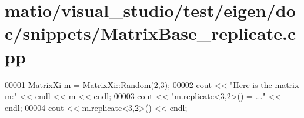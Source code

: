 \hypertarget{matio_2visual__studio_2test_2eigen_2doc_2snippets_2_matrix_base__replicate_8cpp_source}{}\section{matio/visual\+\_\+studio/test/eigen/doc/snippets/\+Matrix\+Base\+\_\+replicate.cpp}
\label{matio_2visual__studio_2test_2eigen_2doc_2snippets_2_matrix_base__replicate_8cpp_source}

\begin{DoxyCode}
00001 MatrixXi m = MatrixXi::Random(2,3);
00002 cout << \textcolor{stringliteral}{"Here is the matrix m:"} << endl << m << endl;
00003 cout << \textcolor{stringliteral}{"m.replicate<3,2>() = ..."} << endl;
00004 cout << m.replicate<3,2>() << endl;
\end{DoxyCode}
